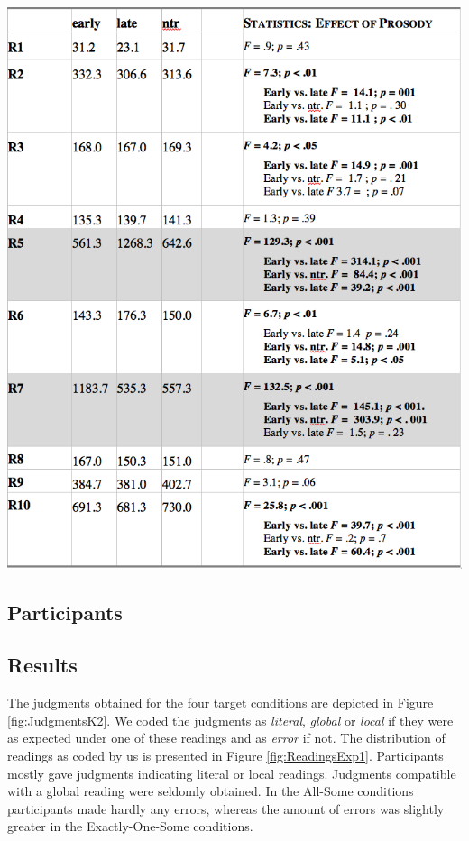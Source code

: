 \documentclass[fleqn,reqno,10pt,draft]{article}
\begin{document}
\begin{table}
  \centering
  
  \includegraphics[width=\textwidth]{../pictures/Acoustics/Table-D.png}

  \caption{???}  
  \label{tab:table-D}
\end{table}

\subsection{Participants}
\label{sec:participants} 

\subsection{Results}
\label{sec:results}

The judgments obtained for the four target conditions are depicted in
Figure \ref{fig:JudgmentsK2}.  We coded the judgments as {\it
  literal}, {\it global} or {\it local} if they were as expected under
one of these readings and as {\it error} if not. The distribution of
readings as coded by us is presented in Figure
\ref{fig:ReadingsExp1}. Participants mostly gave judgments indicating
literal or local readings. Judgments compatible with a global reading
were seldomly obtained. In the All-Some conditions participants made
hardly any errors, whereas the amount of errors was slightly greater
in the Exactly-One-Some conditions.
\end{document}
